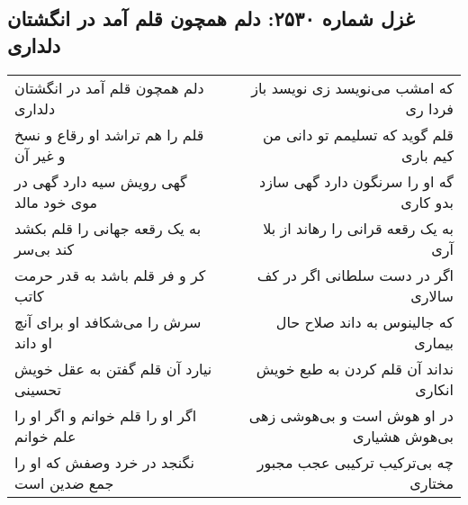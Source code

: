 \begin{center}
\section*{غزل شماره ۲۵۳۰: دلم همچون قلم آمد در انگشتان دلداری}
\label{sec:2530}
\begin{longtable}{l p{0.5cm} r}
دلم همچون قلم آمد در انگشتان دلداری
&&
که امشب می‌نویسد زی نویسد باز فردا ری
\\
قلم را هم تراشد او رقاع و نسخ و غیر آن
&&
قلم گوید که تسلیمم تو دانی من کیم باری
\\
گهی رویش سیه دارد گهی در موی خود مالد
&&
گه او را سرنگون دارد گهی سازد بدو کاری
\\
به یک رقعه جهانی را قلم بکشد کند بی‌سر
&&
به یک رقعه قرانی را رهاند از بلا آری
\\
کر و فر قلم باشد به قدر حرمت کاتب
&&
اگر در دست سلطانی اگر در کف سالاری
\\
سرش را می‌شکافد او برای آنچ او داند
&&
که جالینوس به داند صلاح حال بیماری
\\
نیارد آن قلم گفتن به عقل خویش تحسینی
&&
نداند آن قلم کردن به طبع خویش انکاری
\\
اگر او را قلم خوانم و اگر او را علم خوانم
&&
در او هوش است و بی‌هوشی زهی بی‌هوش هشیاری
\\
نگنجد در خرد وصفش که او را جمع ضدین است
&&
چه بی‌ترکیب ترکیبی عجب مجبور مختاری
\\
\end{longtable}
\end{center}

